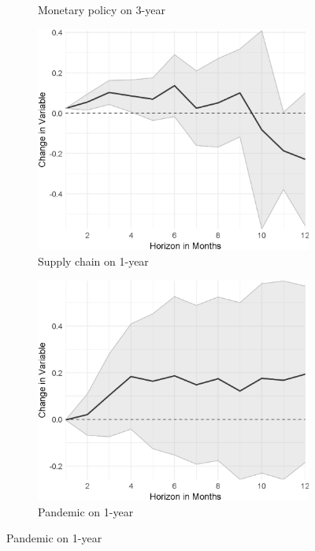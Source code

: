 \begin{figure}[H]
\begin{subfigure}{00.32\textwidth}
	\caption{Monetary policy on 3-year}
\end{subfigure}
\begin{subfigure}{00.32\textwidth}
	\includegraphics[width=1\textwidth]{output/lp/baseline/level/supply_chain/supply_chainonexpectations1y_djn.eps}
	\caption{Supply chain on 1-year}
\end{subfigure}
\begin{subfigure}{00.32\textwidth}
	\includegraphics[width=1\textwidth]{output/lp/baseline/level/pandemic/pandemiconexpectations1y_djn.eps}
	\caption{Pandemic on 1-year}
\end{subfigure}

\end{figure}
